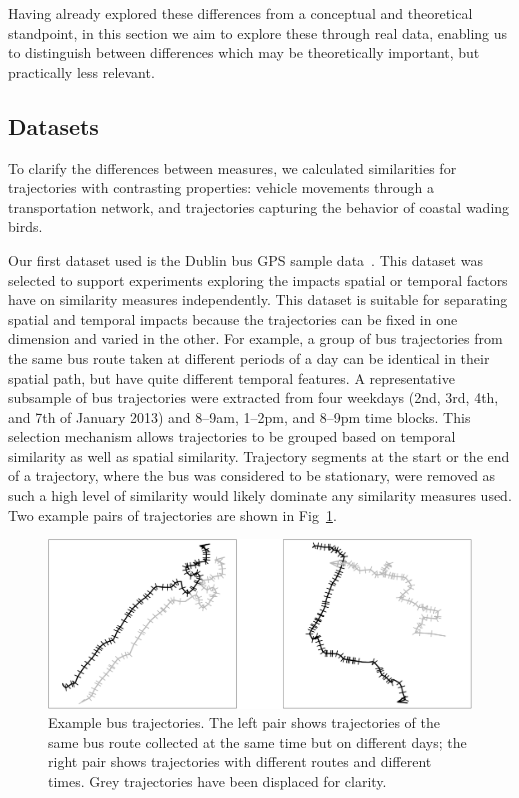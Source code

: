 \documentclass[10pt,letterpaper]{article}
\begin{document}
Having already explored these differences from a conceptual and theoretical standpoint, in this section we aim to explore these through real data, enabling us to distinguish between differences which may be theoretically important, but practically less relevant.


\subsection{Datasets}
\label{sub:datasets}

To clarify the differences between measures, we calculated similarities for trajectories with contrasting properties: vehicle movements through a transportation network, and trajectories capturing the behavior of coastal wading birds. 
	
Our first dataset used is the Dublin bus GPS sample data~\cite{DublinBus}.  This dataset was selected to support experiments exploring the impacts spatial or temporal factors have on similarity measures independently. This dataset is suitable for separating spatial and temporal impacts because the trajectories can be fixed in one dimension and varied in the other. For example, a group of bus trajectories from the same bus route taken at different periods of a day can be identical in their spatial path, but have quite different temporal features. A representative subsample of bus trajectories were extracted from four weekdays (2nd, 3rd, 4th, and 7th of January 2013) and 8--9am, 1--2pm, and 8--9pm time blocks. This selection mechanism allows trajectories to be grouped based on temporal similarity as well as spatial similarity. Trajectory segments at the start or the end of a trajectory, where the bus was considered to be stationary, were removed as such a high level of similarity would likely dominate any similarity measures used. Two example pairs of trajectories are shown in Fig~\ref{fig:eg_bus}. 

\begin{figure}[ht]
	 \centering
	 \includegraphics[width=120mm]{figures/busRoutesComparison}
	 \caption{Example bus trajectories. The left pair shows trajectories of the same bus route collected at the same time but on different days; the right pair shows trajectories with different routes and different times. Grey trajectories have been displaced for clarity.}
	 \label{fig:eg_bus}
\end{figure} 
\end{document}

